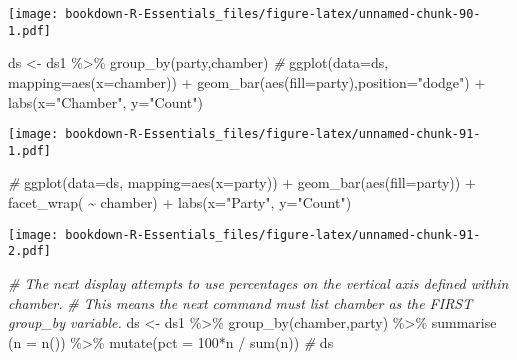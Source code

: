 \documentclass[
]{book}
\newenvironment{Shaded}{\begin{snugshade}}{\end{snugshade}}
\newcommand{\AttributeTok}[1]{\textcolor[rgb]{0.77,0.63,0.00}{#1}}
\newcommand{\CommentTok}[1]{\textcolor[rgb]{0.56,0.35,0.01}{\textit{#1}}}
\newcommand{\DecValTok}[1]{\textcolor[rgb]{0.00,0.00,0.81}{#1}}
\newcommand{\FunctionTok}[1]{\textcolor[rgb]{0.00,0.00,0.00}{#1}}
\newcommand{\NormalTok}[1]{#1}
\newcommand{\OtherTok}[1]{\textcolor[rgb]{0.56,0.35,0.01}{#1}}
\newcommand{\SpecialCharTok}[1]{\textcolor[rgb]{0.00,0.00,0.00}{#1}}
\newcommand{\StringTok}[1]{\textcolor[rgb]{0.31,0.60,0.02}{#1}}
\begin{document}
\texttt{[image: bookdown-R-Essentials\_files/figure-latex/unnamed-chunk-90-1.pdf]}

\begin{Shaded}
\begin{Highlighting}[]
\NormalTok{ds }\OtherTok{\textless{}{-}}\NormalTok{ ds1 }\SpecialCharTok{\%\textgreater{}\%} \FunctionTok{group\_by}\NormalTok{(party,chamber)}
\CommentTok{\#}
\FunctionTok{ggplot}\NormalTok{(}\AttributeTok{data=}\NormalTok{ds, }\AttributeTok{mapping=}\FunctionTok{aes}\NormalTok{(}\AttributeTok{x=}\NormalTok{chamber)) }\SpecialCharTok{+} 
  \FunctionTok{geom\_bar}\NormalTok{(}\FunctionTok{aes}\NormalTok{(}\AttributeTok{fill=}\NormalTok{party),}\AttributeTok{position=}\StringTok{"dodge"}\NormalTok{) }\SpecialCharTok{+}
  \FunctionTok{labs}\NormalTok{(}\AttributeTok{x=}\StringTok{"Chamber"}\NormalTok{, }\AttributeTok{y=}\StringTok{"Count"}\NormalTok{)}
\end{Highlighting}
\end{Shaded}

\texttt{[image: bookdown-R-Essentials\_files/figure-latex/unnamed-chunk-91-1.pdf]}

\begin{Shaded}
\begin{Highlighting}[]
\CommentTok{\#}
\FunctionTok{ggplot}\NormalTok{(}\AttributeTok{data=}\NormalTok{ds, }\AttributeTok{mapping=}\FunctionTok{aes}\NormalTok{(}\AttributeTok{x=}\NormalTok{party)) }\SpecialCharTok{+} 
  \FunctionTok{geom\_bar}\NormalTok{(}\FunctionTok{aes}\NormalTok{(}\AttributeTok{fill=}\NormalTok{party)) }\SpecialCharTok{+}
  \FunctionTok{facet\_wrap}\NormalTok{( }\SpecialCharTok{\textasciitilde{}}\NormalTok{ chamber) }\SpecialCharTok{+}
  \FunctionTok{labs}\NormalTok{(}\AttributeTok{x=}\StringTok{"Party"}\NormalTok{, }\AttributeTok{y=}\StringTok{"Count"}\NormalTok{)}
\end{Highlighting}
\end{Shaded}

\texttt{[image: bookdown-R-Essentials\_files/figure-latex/unnamed-chunk-91-2.pdf]}

\begin{Shaded}
\begin{Highlighting}[]
\CommentTok{\#  The next display attempts to use percentages on the vertical axis defined within chamber.}
\CommentTok{\# This means the next command must list chamber as the FIRST group\_by variable.}
\NormalTok{ds }\OtherTok{\textless{}{-}}\NormalTok{ ds1 }\SpecialCharTok{\%\textgreater{}\%} \FunctionTok{group\_by}\NormalTok{(chamber,party)  }\SpecialCharTok{\%\textgreater{}\%}
   \FunctionTok{summarise}\NormalTok{ (}\AttributeTok{n =} \FunctionTok{n}\NormalTok{()) }\SpecialCharTok{\%\textgreater{}\%}
  \FunctionTok{mutate}\NormalTok{(}\AttributeTok{pct =} \DecValTok{100}\SpecialCharTok{*}\NormalTok{n }\SpecialCharTok{/} \FunctionTok{sum}\NormalTok{(n)) }
\CommentTok{\#}
\NormalTok{ds}
\end{Highlighting}
\end{Shaded}
\end{document}
